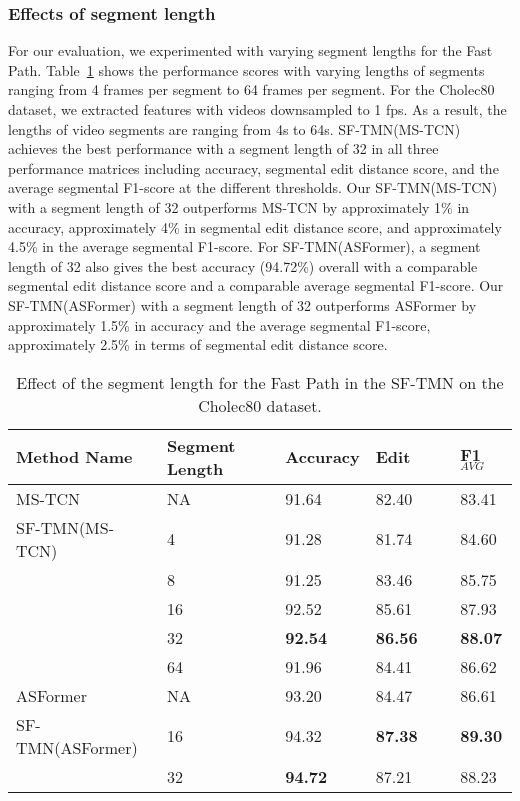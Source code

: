 \documentclass[sn-mathphys,Numbered]{sn-jnl}
\theoremstyle{thmstyleone}\newtheorem{theorem}{Theorem}\newtheorem{proposition}[theorem]{Proposition}
\theoremstyle{thmstyletwo}\newtheorem{example}{Example}\newtheorem{remark}{Remark}
\theoremstyle{thmstylethree}\newtheorem{definition}{Definition}
\begin{document}
\subsubsection{Effects of segment length} For our evaluation, we experimented with varying segment lengths for the Fast Path. Table~\ref{tab3} shows the performance scores with varying lengths of segments ranging from 4 frames per segment to 64 frames per segment. For the Cholec80 dataset, we extracted features with videos downsampled to 1 fps. As a result, the lengths of video segments are ranging from 4s to 64s. SF-TMN(MS-TCN) achieves the best performance with a segment length of 32 in all three performance matrices including accuracy, segmental edit distance score, and the average segmental F1-score at the different thresholds. Our SF-TMN(MS-TCN) with a segment length of 32 outperforms MS-TCN by approximately 1\% in accuracy, approximately 4\% in segmental edit distance score, and approximately 4.5\% in the average segmental F1-score.
For SF-TMN(ASFormer), a segment length of 32 also gives the best accuracy (94.72\%) overall with a comparable segmental edit distance score and a comparable average segmental F1-score. Our SF-TMN(ASFormer) with a segment length of 32 outperforms ASFormer by approximately 1.5\% in accuracy and the average segmental F1-score, approximately 2.5\% in terms of segmental edit distance score.


\begin{table}[h]
\centering
\caption{Effect of the segment length for the Fast Path in the SF-TMN on the Cholec80 dataset.}\label{tab3}
\begin{tabular}{lllll}
\hline
Method Name &  Segment Length & Accuracy & Edit & F1$_{AVG}$\\
\hline
{MS-TCN} & NA & 91.64    &82.40    &83.41 \\
\hline
{SF-TMN(MS-TCN)} & 4 & 91.28 & 81.74 & 84.60 \\
                & 8 & 91.25 & 83.46 & 85.75 \\
                & 16 & 92.52 & 85.61 & 87.93 \\
                & 32 & \textbf{92.54} & \textbf{86.56} & \textbf{88.07} \\
                & 64 & 91.96 & 84.41 & 86.62 \\
\hline
{ASFormer} & NA & 93.20    &84.47    &86.61 \\
\hline
{SF-TMN(ASFormer)} & 16 & 94.32 & \textbf{87.38} & \textbf{89.30} \\
                & 32 & \textbf{94.72} & 87.21 &  88.23 \\
\hline
\end{tabular}
\end{table}
\end{document}
